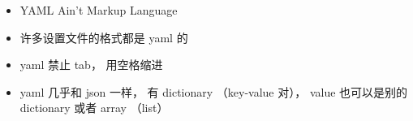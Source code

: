 
\begin{issues}
\issueDraft
\end{issues}

\begin{itemize}
\item YAML Ain't Markup Language
\item 许多设置文件的格式都是 yaml 的
\item yaml 禁止 tab， 用空格缩进
\item yaml 几乎和 json 一样， 有 dictionary （key-value 对）， value 也可以是别的 dictionary 或者 array （list）
\end{itemize}
